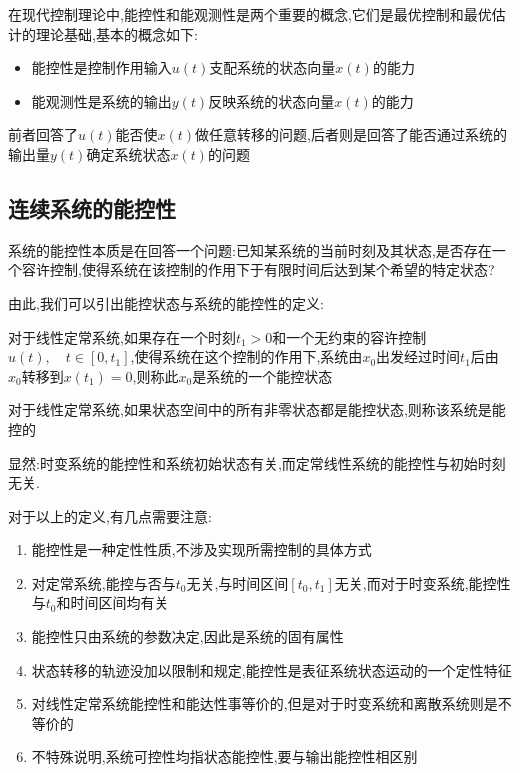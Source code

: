 在现代控制理论中,能控性和能观测性是两个重要的概念,它们是最优控制和最优估计的理论基础,基本的概念如下:
\begin{definition}[能控性与能观性的概念]
    \begin{itemize}
        \item 能控性是控制作用输入$u(t)$支配系统的状态向量$x(t)$的能力
        \item 能观测性是系统的输出$y(t)$反映系统的状态向量$x(t)$的能力
    \end{itemize}
    
    前者回答了$u(t)$能否使$x(t)$做任意转移的问题,后者则是回答了能否通过系统的输出量$y(t)$确定系统状态$x(t)$的问题
\end{definition}

\subsection{连续系统的能控性}

系统的能控性本质是在回答一个问题:已知某系统的当前时刻及其状态,是否存在一个容许控制,使得系统在该控制的作用下于有限时间后达到某个希望的特定状态?

由此,我们可以引出能控状态与系统的能控性的定义:
\begin{definition}[能控状态]
    对于线性定常系统,如果存在一个时刻$t_1 > 0$和一个无约束的容许控制$u(t),\quad t \in \left[0,t_1\right]$,使得系统在这个控制的作用下,系统由$x_0$出发经过时间$t_1$后由$x_0$转移到$x(t_1) = 0$,则称此$x_0$是系统的一个能控状态
\end{definition}

\begin{definition}[系统的能控性]
    对于线性定常系统,如果状态空间中的所有非零状态都是能控状态,则称该系统是能控的
\end{definition}

显然:时变系统的能控性和系统初始状态有关,而定常线性系统的能控性与初始时刻无关.

对于以上的定义,有几点需要注意:
\begin{enumerate}
    \item 能控性是一种定性性质,不涉及实现所需控制的具体方式
    \item 对定常系统,能控与否与$t_0$无关,与时间区间$\left[ t_0,t_1 \right]$无关,而对于时变系统,能控性与$t_0$和时间区间均有关
    \item 能控性只由系统的参数决定,因此是系统的固有属性
    \item 状态转移的轨迹没加以限制和规定,能控性是表征系统状态运动的一个定性特征
    \item 对线性定常系统能控性和能达性事等价的,但是对于时变系统和离散系统则是不等价的
    \item 不特殊说明,系统可控性均指状态能控性,要与输出能控性相区别
\end{enumerate}

